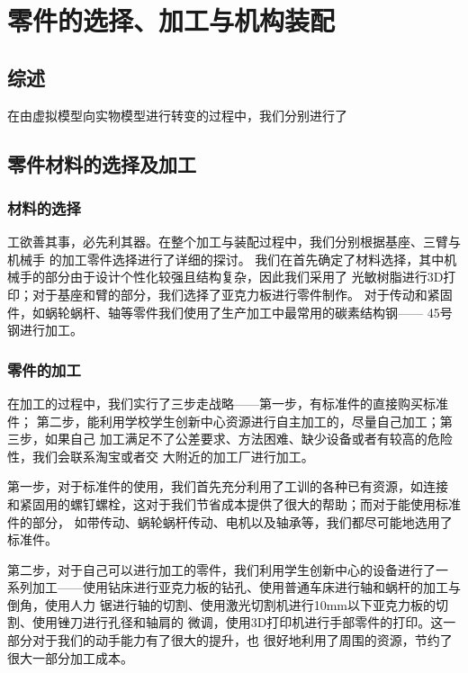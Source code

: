 
\chapter{零件的选择、加工与机构装配}

\section{综述}

{\songti 在由虚拟模型向实物模型进行转变的过程中，我们分别进行了}

\section{零件材料的选择及加工}

\subsection{材料的选择}

{\songti 工欲善其事，必先利其器。在整个加工与装配过程中，我们分别根据基座、三臂与机械手
的加工零件选择进行了详细的探讨。
我们在首先确定了材料选择，其中机械手的部分由于设计个性化较强且结构复杂，因此我们采用了
光敏树脂进行3D打印；对于基座和臂的部分，我们选择了亚克力板进行零件制作。
对于传动和紧固件，如蜗轮蜗杆、轴等零件我们使用了生产加工中最常用的碳素结构钢——
45号钢进行加工。}

\subsection{零件的加工}

{\songti 在加工的过程中，我们实行了三步走战略——第一步，有标准件的直接购买标准件；
第二步，能利用学校学生创新中心资源进行自主加工的，尽量自己加工；第三步，如果自己
加工满足不了公差要求、方法困难、缺少设备或者有较高的危险性，我们会联系淘宝或者交
大附近的加工厂进行加工。}

{\songti 第一步，对于标准件的使用，我们首先充分利用了工训的各种已有资源，如连接
和紧固用的螺钉螺栓，这对于我们节省成本提供了很大的帮助；而对于能使用标准件的部分，
如带传动、蜗轮蜗杆传动、电机以及轴承等，我们都尽可能地选用了标准件。}

{\songti 第二步，对于自己可以进行加工的零件，我们利用学生创新中心的设备进行了一
系列加工——使用钻床进行亚克力板的钻孔、使用普通车床进行轴和蜗杆的加工与倒角，使用人力
锯进行轴的切割、使用激光切割机进行10mm以下亚克力板的切割、使用锉刀进行孔径和轴肩的
微调，使用3D打印机进行手部零件的打印。这一部分对于我们的动手能力有了很大的提升，也
很好地利用了周围的资源，节约了很大一部分加工成本。}

